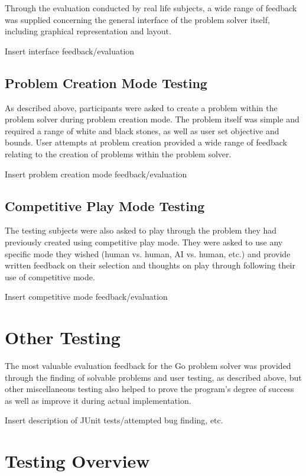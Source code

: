 \documentclass{l3proj}
\begin{document}
Through the evaluation conducted by real life subjects, a wide range of feedback was supplied concerning the general interface of the problem solver itself, including graphical representation and layout.

Insert interface feedback/evaluation

\subsection{Problem Creation Mode Testing}

As described above, participants were asked to create a problem within the problem solver during problem creation mode. The problem itself was simple and required a range of white and black stones, as well as user set objective and bounds. User attempts at problem creation provided a wide range of feedback relating to the creation of problems within the problem solver.

Insert problem creation mode feedback/evaluation

\subsection{Competitive Play Mode Testing}

The testing subjects were also asked to play through the problem they had previously created using competitive play mode. They were asked to use any specific mode they wished (human vs. human, AI vs. human, etc.) and provide written feedback on their selection and thoughts on play through following their use of competitive mode.

Insert competitive mode feedback/evaluation

\section{Other Testing}

The most valuable evaluation feedback for the Go problem solver was provided through the finding of solvable problems and user testing, as described above, but other miscellaneous testing also helped to prove the program's degree of success as well as improve it during actual implementation.

Insert description of JUnit tests/attempted bug finding, etc.

\section{Testing Overview}
\end{document}

